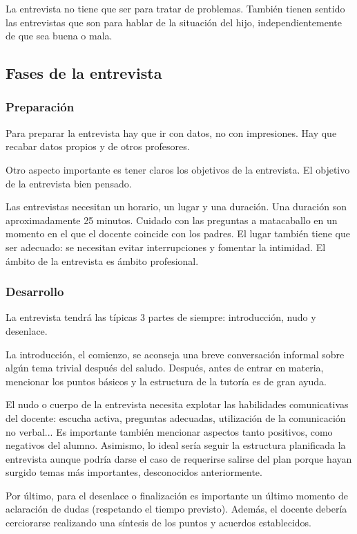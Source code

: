\documentclass[palatino]{apuntesURJC}
\begin{document}
La entrevista no tiene que ser para tratar de problemas. 
%
También tienen sentido las entrevistas que son para hablar de la situación del hijo, independientemente de que sea buena o mala.

\subsection{Fases de la entrevista}

\subsubsection{Preparación}

Para preparar la entrevista hay que ir con datos, no con impresiones. 
%
Hay que recabar datos propios y de otros profesores.

Otro aspecto importante es tener claros los objetivos de la entrevista.
%
El objetivo de la entrevista bien pensado.


Las entrevistas necesitan un horario, un lugar y una duración. 
%
Una duración son aproximadamente 25 minutos.
%
Cuidado con las preguntas a matacaballo en un momento en el que el docente coincide con los padres.
%
El lugar también tiene que ser adecuado: se necesitan evitar interrupciones y fomentar la intimidad.
%
El ámbito de la entrevista es ámbito profesional. 


\subsubsection{Desarrollo}

La entrevista tendrá las típicas 3 partes de siempre: introducción, nudo y desenlace.

La introducción, el comienzo, se aconseja una breve conversación informal sobre algún tema trivial después del saludo.
%
Después, antes de entrar en materia, mencionar los puntos básicos y la estructura de la tutoría es de gran ayuda.

El nudo o cuerpo de la entrevista necesita explotar las habilidades comunicativas del docente: escucha activa, preguntas adecuadas, utilización de la comunicación no verbal... 
%
Es importante también mencionar aspectos tanto positivos, como negativos del alumno.
%
Asimismo, lo ideal sería seguir la estructura planificada la entrevista aunque podría darse el caso de requerirse salirse del plan porque hayan surgido temas más importantes, desconocidos anteriormente.

Por último, para el desenlace o finalización es importante un último momento de aclaración de dudas (respetando el tiempo previsto).
%
Además, el docente debería cerciorarse realizando una síntesis de los puntos y acuerdos establecidos.
\end{document}
